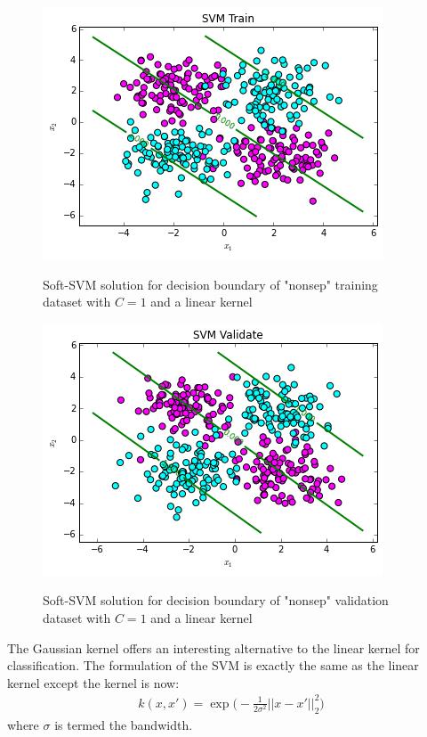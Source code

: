 \documentclass[10pt]{article}
\begin{document}
\begin{figure}
\centering
\includegraphics[scale=0.5]{svm_nonsep_train.png}
\label{svm_toy}
\caption{Soft-SVM solution for decision boundary of "nonsep" training dataset with $C=1$ and a linear kernel}
\end{figure}
\begin{figure}
\centering
\includegraphics[scale=0.5]{svm_nonsep_val.png}
\label{svm_toy}
\caption{Soft-SVM solution for decision boundary of "nonsep" validation dataset with $C=1$ and a linear kernel}
\end{figure}


The Gaussian kernel offers an interesting alternative to the linear kernel for classification.  The formulation of the SVM is exactly the same as the linear kernel except the kernel is now:
\begin{equation}
\begin{aligned}
k(x,x') = \exp\big( - \frac{1}{2 \sigma^2} ||x-x'||_2^2  \big)
\end{aligned}
\end{equation}
where $\sigma$ is termed the bandwidth.
\end{document}
